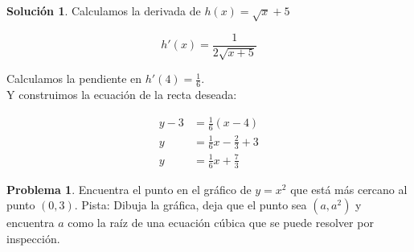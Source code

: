 \documentclass{article}
\theoremstyle{definition}
\newtheorem{problem}{Problema}
\newtheorem*{solution}{Solución}
\begin{document}
\begin{solution}

Calculamos la derivada de \( h(x) = \sqrt{x} + 5 \)

\[
h'(x) = \frac{1}{2\sqrt{x+5}}
\]

Calculamos la pendiente en \( h'(4) = \frac{1}{6} \). \\

Y construimos la ecuación de la recta deseada:

\begin{align*}
    y - 3 &= \frac{1}{6}(x-4) \\
    y &= \frac{1}{6}x - \frac{2}{3} + 3 \\
    y &= \frac{1}{6}x + \frac{7}{3}
\end{align*}

\end{solution}

\bigskip

\begin{problem}
Encuentra el punto en el gráfico de \( y = x^2 \) que está más cercano al punto \( (0,3) \).  
Pista: Dibuja la gráfica, deja que el punto sea \( (a, a^2) \) y encuentra \( a \) como la raíz de una ecuación cúbica que se puede resolver por inspección.
\end{problem}
\end{document}
